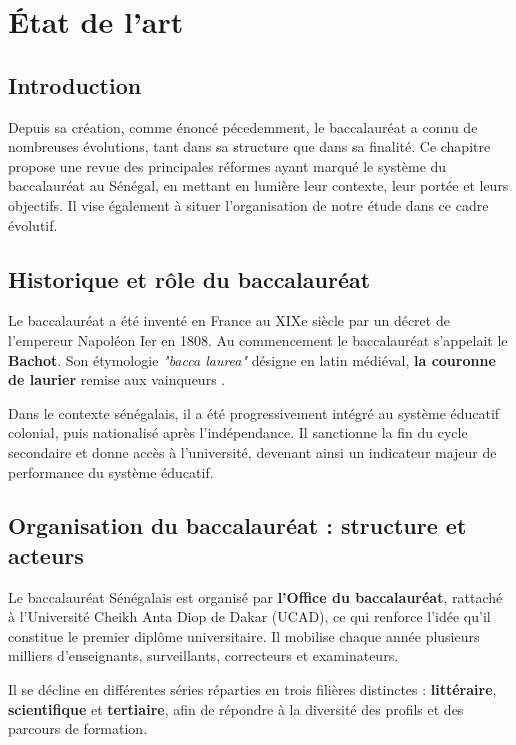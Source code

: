 \chapter{État de l’art}

\section{Introduction}

Depuis sa création, comme énoncé pécedemment, le baccalauréat a connu de nombreuses évolutions, tant dans sa structure que dans sa finalité.
Ce chapitre propose une revue des principales réformes ayant marqué le système du baccalauréat au Sénégal, en mettant en lumière leur contexte, leur portée et leurs objectifs.
Il vise également à situer l'organisation de notre étude dans ce cadre évolutif. 

\section{Historique et rôle du baccalauréat}

Le baccalauréat a été inventé en France au XIXe siècle par un décret de l'empereur Napoléon Ier en 1808.
Au commencement le baccalauréat s'appelait le \textbf{Bachot}.
Son étymologie \textit{ "bacca laurea"} désigne en latin médiéval, \textbf{la couronne de laurier} remise aux vainqueurs \cite{bacHistorique}.

Dans le contexte sénégalais, il a été progressivement intégré au système éducatif colonial, puis nationalisé après l’indépendance. 
Il sanctionne la fin du cycle secondaire et donne accès à l’université, devenant ainsi un indicateur majeur de performance du système éducatif.

\section{Organisation du baccalauréat : structure et acteurs}

Le baccalauréat Sénégalais est organisé par \textbf{l'Office du baccalauréat}, rattaché à l'Université Cheikh Anta Diop de Dakar (UCAD), ce qui renforce l'idée qu'il constitue le premier diplôme universitaire.
Il mobilise chaque année plusieurs milliers d’enseignants, surveillants, correcteurs et examinateurs.

Il se décline en différentes séries réparties en trois filières distinctes : \textbf{littéraire}, \textbf{scientifique} et \textbf{tertiaire}, afin de répondre à la diversité des profils et des parcours de formation. 

